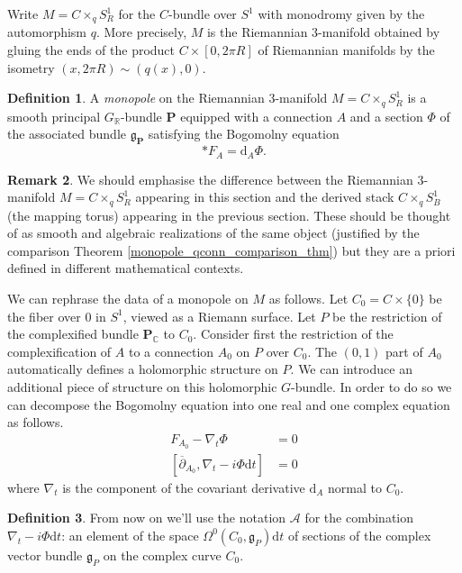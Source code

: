 \documentclass[11pt, oneside, reqno]{amsart}
\theoremstyle{definition} \newtheorem{definition}{Definition}[section]
\theoremstyle{definition} \newtheorem{remark}[definition]{Remark}
\theoremstyle{definition} \newtheorem{remarks}[definition]{Remarks}
\theoremstyle{definition} \newtheorem{question}[definition]{Question}
\theoremstyle{definition} \newtheorem*{note}{Note}
\theoremstyle{definition} \newtheorem{example}[definition]{Example}
\theoremstyle{definition} \newtheorem{examples}[definition]{Examples}
\renewcommand{\gg}{\mathfrak{g}}
\newcommand{\mc}[1]{\mathcal{#1}}
\newcommand{\bo}[1]{\boldsymbol{#1}}
\newcommand{\del}{\partial}
\newcommand{\ol}[1]{\overline{#1}}
\newcommand{\CC}{\mathbb{C}}
\newcommand{\RR}{\mathbb{R}}
\renewcommand{\d}{\mathrm{d}}
\begin{document}
Write $M = C\times_q S^1_R$ for the $C$-bundle over $S^1$ with monodromy given by the automorphism $q$.  More precisely, $M$ is the Riemannian 3-manifold obtained by gluing the ends of the product $C \times [0,2\pi R]$ of Riemannian manifolds by the isometry $(x,2\pi R) \sim (q(x), 0)$.

\begin{definition}
A \emph{monopole} on the Riemannian 3-manifold $M = C \times_q S^1_R$ is a smooth principal $G_\RR$-bundle $\bo P$ equipped with a connection $A$ and a section $\Phi$ of the associated bundle $\gg_{\bo P}$ satisfying the Bogomolny equation 
\[\ast F_A = \d_A \Phi.\]
\end{definition}

\begin{remark}
We should emphasise the difference between the Riemannian 3-manifold $M = C \times_q S^1_R$ appearing in this section and the derived stack $C \times_q S^1_B$ (the mapping torus) appearing in the previous section.  These should be thought of as smooth and algebraic realizations of the same object (justified by the comparison Theorem \ref{monopole_qconn_comparison_thm}) but they are a priori defined in different mathematical contexts.
\end{remark}

We can rephrase the data of a monopole on $M$ as follows.  Let $C_0 = C \times \{0\}$ be the fiber over $0$ in $S^1$, viewed as a Riemann surface.  Let $P$ be the restriction of the complexified bundle $\bo P_\CC$ to $C_0$.  Consider first the restriction of the complexification of $A$ to a connection $A_0$ on $P$ over $C_0$.  The $(0,1)$ part of $A_0$ automatically defines a holomorphic structure on $P$.  We can introduce an additional piece of structure on this holomorphic $G$-bundle.  In order to do so we can decompose the Bogomolny equation into one real and one complex equation as follows.
\begin{align*}
F_{A_0} - \nabla_t \Phi &= 0 \\
[\ol{\del}_{A_0}, \nabla_t - i\Phi \d t] &= 0 
\end{align*}
where $\nabla_t$ is the component of the covariant derivative $\d_A$ normal to $C_0$.  

\begin{definition} 
From now on we'll use the notation $\mc A$ for the combination $\nabla_t - i\Phi \d t$: an element of the space $\Omega^0(C_0, \gg_P)\d t$ of sections of the complex vector bundle $\gg_P$ on the complex curve $C_0$. 
\end{definition}
\end{document}
